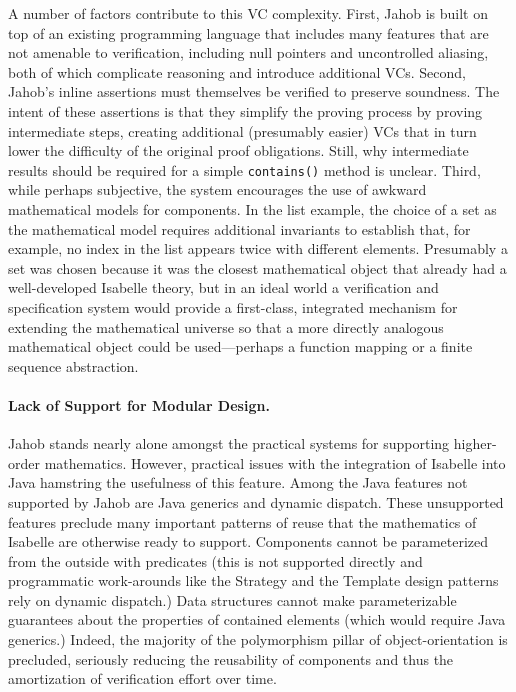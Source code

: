 A number of factors contribute to this VC complexity.  First, Jahob is built on top of an existing programming language that includes many features that are not amenable to verification, including null pointers and uncontrolled aliasing, both of which complicate reasoning and introduce additional VCs\cite{weideVerificationReferences}.  Second, Jahob's inline assertions must themselves be verified to preserve soundness.  The intent of these assertions is that they simplify the proving process by proving intermediate steps, creating additional (presumably easier) VCs that in turn lower the difficulty of the original proof obligations.  Still, why intermediate results should be required for a simple \texttt{contains()} method is unclear.  Third, while perhaps subjective, the system encourages the use of awkward mathematical models for components.  In the list example, the choice of a set as the mathematical model requires additional invariants to establish that, for example, no index in the list appears twice with different elements.  Presumably a set was chosen because it was the closest mathematical object that already had a well-developed Isabelle theory, but in an ideal world a verification and specification system would provide a first-class, integrated mechanism for extending the mathematical universe so that a more directly analogous mathematical object could be used---perhaps a function mapping or a finite sequence abstraction.

\paragraph{Lack of Support for Modular Design.\label{sec:jahobNoModularity}}
Jahob stands nearly alone amongst the practical systems for supporting higher-order mathematics.  However, practical issues with the integration of Isabelle into Java hamstring the usefulness of this feature.  Among the Java features not supported by Jahob are Java generics and dynamic dispatch.  These unsupported features preclude many important patterns of reuse that the mathematics of Isabelle are otherwise ready to support.  Components cannot be parameterized from the outside with predicates (this is not supported directly and programmatic work-arounds like the Strategy and the Template design patterns rely on dynamic dispatch.)  Data structures cannot make parameterizable guarantees about the properties of contained elements (which would require Java generics.)  Indeed, the majority of the polymorphism pillar of object-orientation is precluded, seriously reducing the reusability of components and thus the amortization of verification effort over time.

